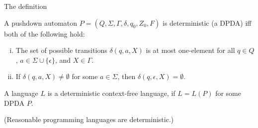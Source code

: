 \documentclass[handout]{beamer}
\begin{document}
\begin{frame}{The definition}

    \begin{definition}
        A pushdown automaton $P=(Q,\Sigma,\Gamma,\delta,q_0,Z_0,F)$ is \alert{deterministic} (a \alert{DPDA}) iff both of the following hold:
        \begin{enumerate}[(i)]
            \item The set of possible transitions $\delta(q,a,X)$ is at most one-element for all  $q\in Q$, $a\in\Sigma \cup \{\epsilon\}$, and $X\in\Gamma$.
            \item If $\delta(q,a,X)\neq\emptyset$ for some $a\in \Sigma$, then $\delta(q,\epsilon,X)=\emptyset$.
        \end{enumerate}    
    \end{definition}

    A language $L$ is a \alert{deterministic} context-free language, if $L=L(P)$ for some DPDA $P$.

    \medskip

    (Reasonable programming languages are deterministic.)

\end{frame}
\end{document}
